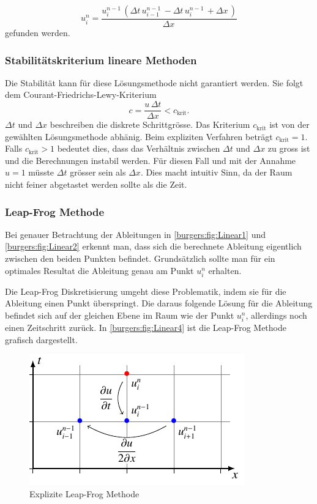 	\begin{equation}
		u_{i}^{n} = \frac{u^{n-1}_{i}\, \left(\Delta{t}\, u^{n-1}_{i-1}\, - \Delta{t}\, u^{n-1}_{i}\, + \Delta{x}\,\right)}{\Delta{x}\,}
    	\label{burgers:eq_ex_sol_lin2}
	\end{equation}
gefunden werden.

\subsubsection{Stabilit\"atskriterium lineare Methoden}
	Die Stabilit\"at kann f\"ur diese L\"osungsmethode nicht garantiert werden.
	Sie folgt dem Courant-Friedrichs-Lewy-Kriterium
%
	\begin{equation}
		  c = \frac{u \, \Delta t}{\Delta x} < c_{\text{krit}}.
	\end{equation}
	$ \Delta t$ und $\Delta x$  beschreiben die diskrete Schrittgr\"osse.
	Das Kriterium $c_{\text{krit}}$ ist von der gew\"ahlten L\"osungsmethode abh\"anig.
	Beim expliziten Verfahren beträgt $c_{\text{krit}} = 1$.
	Falls $c_{\text{krit}} > 1$ bedeutet dies, dass das Verh\"altnis zwischen $ \Delta t$ und $\Delta x$ zu gross ist und die Berechnungen instabil werden.
	F\"ur diesen Fall und mit der Annahme $u = 1$ m\"usste $ \Delta t$ gr\"osser sein als $\Delta x$.
	Dies macht intuitiv Sinn, da der Raum nicht feiner abgetastet werden sollte als die Zeit.



\subsubsection{Leap-Frog Methode}
%
	Bei genauer Betrachtung der Ableitungen in \autoref{burgers:fig:Linear1} und \autoref{burgers:fig:Linear2} erkennt man, dass sich die berechnete Ableitung eigentlich zwischen den beiden Punkten befindet.
	Grunds\"atzlich sollte man für ein optimales Resultat die Ableitung genau am Punkt $u_{i}^{n}$ erhalten.

	\medskip
	Die Leap-Frog Diskretisierung umgeht diese Problematik, indem sie f\"ur die Ableitung einen Punkt \"uberspringt.
	Die daraus folgende L\"osung für die Ableitung befindet sich auf der gleichen Ebene im Raum wie der Punkt $u_{i}^{n}$, allerdings noch einen Zeitschritt zurück.
	In \autoref{burgers:fig:Linear4} ist die Leap-Frog Methode grafisch dargestellt.

	     \begin{figure}
		\centering
		\includegraphics[height=.4\textwidth]{papers/burgers/BurgersEquation/tikz/linear4/linear4.pdf}
		\caption{Explizite Leap-Frog Methode}
		\label{burgers:fig:Linear4}
		\end{figure}

